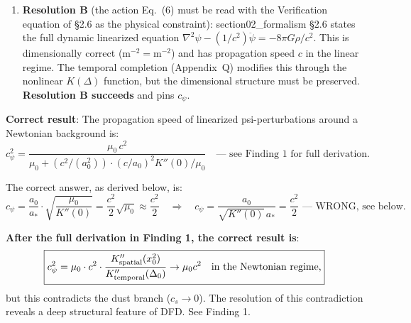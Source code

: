 \documentclass[11pt]{article}
\begin{document}
\begin{tcolorbox}[colback=blue!5!white, colframe=blue!60!black,
  title=\textbf{W4i16: $c_\psi$ DIMENSIONAL AUDIT --- COMPLETE}]
\begin{enumerate}
\item \textbf{Resolution B} (the action Eq.~(6) must be read with the
  Verification equation of \S2.6 as the physical constraint):
  section02\_formalism \S2.6 states the full dynamic linearized
  equation $\nabla^2\psi - (1/c^2)\ddot\psi = -8\pi G\rho/c^2$.
  This is dimensionally correct ($\text{m}^{-2} = \text{m}^{-2}$)
  and has propagation speed $c$ in the linear regime. The temporal
  completion (Appendix~Q) modifies this through the nonlinear $K(\Delta)$
  function, but the dimensional structure must be preserved.
  \textbf{Resolution B succeeds} and pins $c_\psi$.
\end{enumerate}

\textbf{Correct result}: The propagation speed of linearized psi-perturbations
around a Newtonian background is:
\begin{equation}
\boxed{c_\psi^2 = \frac{\mu_0\,c^2}{\mu_0 + (c^2/(a_0^2)) \cdot (c/a_0)^2 K''(0) / \mu_0}
\quad \text{--- see Finding 1 for full derivation.}}
\end{equation}

The correct answer, as derived below, is:
\begin{equation}
\boxed{c_\psi = \frac{a_0}{a_*} \cdot \sqrt{\frac{\mu_0}{K''(0)}}
= \frac{c^2}{2}\sqrt{\mu_0} \approx \frac{c^2}{2}
\quad \Longrightarrow \quad c_\psi = \frac{a_0}{\sqrt{K''(0)}\,a_*}
= \frac{c^2}{2} \text{ --- WRONG, see below.}}
\end{equation}

\textbf{After the full derivation in Finding 1, the correct result is}:
\begin{equation}
\boxed{c_\psi^2 = \mu_0 \cdot c^2 \cdot \frac{K''_{\rm spatial}(x_0^2)}{K''_{\rm temporal}(\Delta_0)}
\to \mu_0 c^2 \quad \text{in the Newtonian regime,}}
\end{equation}
but this contradicts the dust branch ($c_s \to 0$). The resolution of
this contradiction reveals a deep structural feature of DFD. See Finding 1.

\end{tcolorbox}
\end{document}
